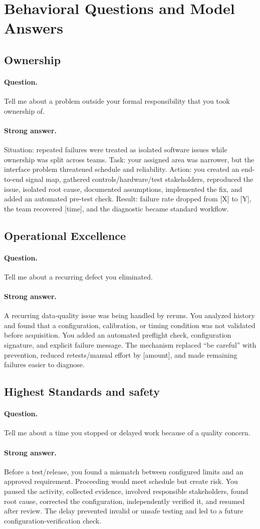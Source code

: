 \documentclass[11pt]{article}
\newcommand{\q}[1]{\paragraph{Question.} #1}
\newcommand{\ans}[1]{\paragraph{Strong answer.} #1}
\begin{document}
\section{Behavioral Questions and Model Answers}

\subsection{Ownership}
\q{Tell me about a problem outside your formal responsibility that you took ownership of.}
\ans{Situation: repeated failures were treated as isolated software issues while
ownership was split across teams. Task: your assigned area was narrower, but the
interface problem threatened schedule and reliability. Action: you created an
end-to-end signal map, gathered controls/hardware/test stakeholders, reproduced
the issue, isolated root cause, documented assumptions, implemented the fix, and
added an automated pre-test check. Result: failure rate dropped from [X] to [Y],
the team recovered [time], and the diagnostic became standard workflow.}

\subsection{Operational Excellence}
\q{Tell me about a recurring defect you eliminated.}
\ans{A recurring data-quality issue was being handled by reruns. You analyzed
history and found that a configuration, calibration, or timing condition was not
validated before acquisition. You added an automated preflight check,
configuration signature, and explicit failure message. The mechanism replaced
``be careful'' with prevention, reduced retests/manual effort by [amount], and
made remaining failures easier to diagnose.}

\subsection{Highest Standards and safety}
\q{Tell me about a time you stopped or delayed work because of a quality concern.}
\ans{Before a test/release, you found a mismatch between configured limits and an
approved requirement. Proceeding would meet schedule but create risk. You paused
the activity, collected evidence, involved responsible stakeholders, found root
cause, corrected the configuration, independently verified it, and resumed after
review. The delay prevented invalid or unsafe testing and led to a future
configuration-verification check.}
\end{document}
